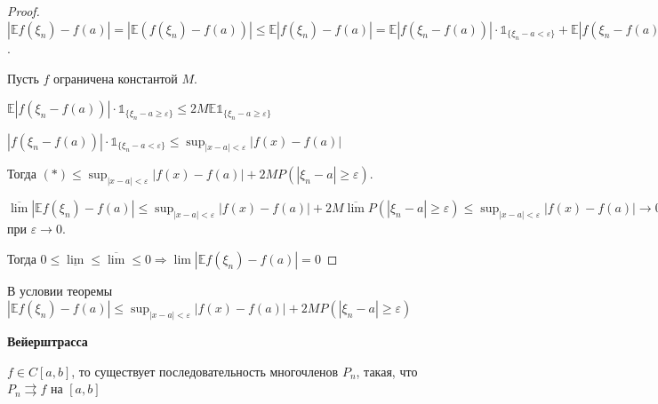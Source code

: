\begin{proof}
    $|\mathbb{E} f(\xi_n) - f(a)| = |\mathbb{E} (f(\xi_n) - f(a))| \leqslant \mathbb{E} |f(\xi_n) - f(a)| =
    \mathbb{E} |f(\xi_n - f(a))|\cdot \mathds{1}_{\{ \xi_n - a < \varepsilon \}} + \mathbb{E} |f(\xi_n - f(a))|\cdot \mathds{1}_{\{ \xi_n - a \geqslant \varepsilon \}} = (*)$.

    Пусть $f$ ограничена константой $M$.

    $\mathbb{E} |f(\xi_n - f(a))|\cdot \mathds{1}_{\{ \xi_n - a \geqslant \varepsilon \}} \leqslant 2M \mathbb{E} \mathds{1}_{\{ \xi_n - a \geqslant \varepsilon \}}$

    $|f(\xi_n - f(a))|\cdot \mathds{1}_{\{ \xi_n - a < \varepsilon \}} \leqslant \sup_{|x - a| < \varepsilon}|f(x) - f(a)|$

    Тогда $(*) \leqslant \sup_{|x - a| < \varepsilon} |f(x) - f(a)| + 2M P(|\xi_n - a| \geqslant \varepsilon)$.

    $\overline{\lim} |\mathbb{E} f(\xi_n) - f(a)| \leqslant \sup_{|x - a| < \varepsilon} |f(x) - f(a)| + 2M \overline{\lim} P(|\xi_n - a| \geqslant \varepsilon) \leqslant
    \sup_{|x - a| < \varepsilon} |f(x) - f(a)| \rightarrow 0$ при $\varepsilon \to 0$.

    Тогда $0 \leqslant \underline{\lim} \leqslant \overline{\lim} \leqslant 0 \Rightarrow \lim |\mathbb{E} f(\xi_n) - f(a)| = 0$
\end{proof}

\begin{remark}
    В условии теоремы $|\mathbb{E} f(\xi_n) - f(a)| \leqslant \sup_{|x - a| < \varepsilon} |f(x) - f(a)| + 2M P(|\xi_n - a| \geqslant \varepsilon)$
\end{remark}

\begin{theorem}
    \textbf{Вейерштрасса}

    $f \in C[a, b]$, то существует последовательность многочленов $P_n$, такая, что $P_n \rightrightarrows f$ на $[a, b]$
\end{theorem}

